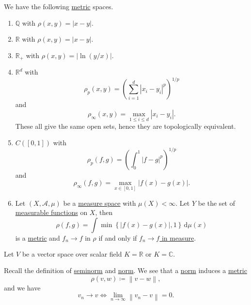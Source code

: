 \begin{eg}
	We have the following \hyperref[def:metric]{metric} spaces.
	\begin{enumerate}[(1)]
		\item \(\mathbb{Q}\) with \(\rho (x, y) = \left\vert x - y \right\vert \).
		\item \(\mathbb{R}\) with \(\rho (x, y) = \left\vert x - y \right\vert \).
		\item \(\mathbb{R}_+\) with \(\rho (x, y) = \left\vert \ln (y / x)\right\vert \).
		\item \(\mathbb{R}^d\) with
		      \[
			      \rho _p(x, y) = \left(\sum\limits_{i=1}^{d} \left\vert x_{i} - y_{i} \right\vert^p \right)^{1 / p}
		      \]
		      and
		      \[
			      \rho _\infty (x, y ) = \mathop{\max} _{1\leq i\leq d}\left\vert x_{i} - y_{i} \right\vert.
		      \]
		      These all give the same open sets, hence they are topologically equivalent.
		\item \(C([0, 1])\) with
		      \[
			      \rho _p(f, g) = \left(\int _0^1 \left\vert f-g \right\vert^p \right)^{1 / p}
		      \]
		      and
		      \[
			      \rho _\infty (f, g) = \mathop{\max} _{x\in[0, 1]}\left\vert f(x) - g(x) \right\vert.
		      \]
		\item Let \((X, \mathcal{A} , \mu )\) be a \hyperref[def:measure-space]{measure space} with \(\mu (X)< \infty \). Let \(Y\) be the set of
		      \hyperref[def:measurable-function]{measurable functions} on \(X\), then
		      \[
			      \rho (f, g) = \int \mathop{\min} \left\{\left\vert f(x) - g(x) \right\vert, 1 \right\}\,\mathrm{d} \mu (x)
		      \]
		      is a \hyperref[def:metric]{metric} and \(f_{n} \to f\) in \(\rho\) if and only if \hyperref[def:converge-in-measure]{\(f_n \to f\) in measure}.
	\end{enumerate}
\end{eg}

Let \(V\) be a vector space over scalar field \(K = \mathbb{R} \) or \(K = \mathbb{C} \).
\begin{prev}\label{induced-metric}
	Recall the definition of \hyperref[def:seminorm]{seminorm} and \hyperref[def:norm]{norm}. We see that a \hyperref[def:norm]{norm} induces a \hyperref[def:metric]{metric}
	\[
		\rho (v, w) \coloneqq \left\lVert v - w\right\rVert,
	\]
	and we have
	\[
		v_{n} \to v \iff \lim\limits_{n \to \infty} \left\lVert v_{n} - v\right\rVert = 0.
	\]
\end{prev}

